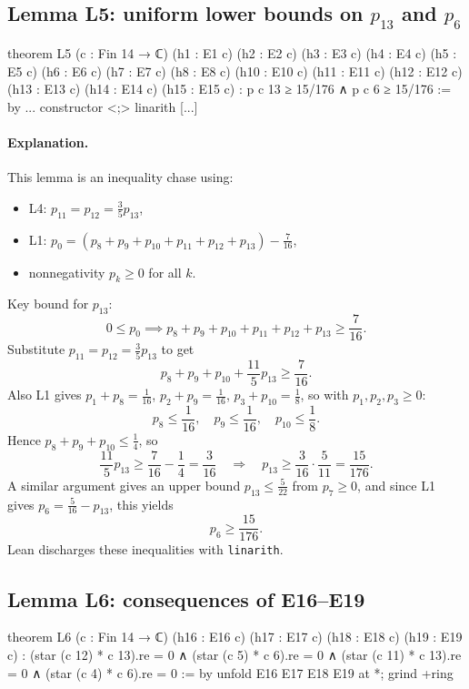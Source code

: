 \documentclass[11pt]{article}
\begin{document}
\subsection*{Lemma L5: uniform lower bounds on $p_{13}$ and $p_6$}

\begin{LeanCode}
theorem L5 (c : Fin 14 → ℂ)
  (h1 : E1 c) (h2 : E2 c) (h3 : E3 c) (h4 : E4 c)
  (h5 : E5 c) (h6 : E6 c) (h7 : E7 c) (h8 : E8 c)
  (h10 : E10 c) (h11 : E11 c) (h12 : E12 c)
  (h13 : E13 c) (h14 : E14 c) (h15 : E15 c) :
  p c 13 ≥ 15/176 ∧ p c 6 ≥ 15/176 := by
  ...
  constructor <;> linarith [...]
\end{LeanCode}

\paragraph{Explanation.}
This lemma is an inequality chase using:
\begin{itemize}
\item L4: $p_{11}=p_{12}=\frac35 p_{13}$,
\item L1: $p_0 = (p_8+p_9+p_{10}+p_{11}+p_{12}+p_{13})-\frac{7}{16}$,
\item nonnegativity $p_k\ge 0$ for all $k$.
\end{itemize}

Key bound for $p_{13}$:
\[
0\le p_0 \implies p_8+p_9+p_{10}+p_{11}+p_{12}+p_{13}\ge \frac{7}{16}.
\]
Substitute $p_{11}=p_{12}=\frac35 p_{13}$ to get
\[
p_8+p_9+p_{10}+\frac{11}{5}p_{13}\ge \frac{7}{16}.
\]
Also L1 gives $p_1+p_8=\frac1{16}$, $p_2+p_9=\frac1{16}$, $p_3+p_{10}=\frac18$, so with $p_1,p_2,p_3\ge 0$:
\[
p_8\le \frac{1}{16},\quad p_9\le \frac{1}{16},\quad p_{10}\le \frac{1}{8}.
\]
Hence $p_8+p_9+p_{10}\le \frac14$, so
\[
\frac{11}{5}p_{13}\ge \frac{7}{16}-\frac14=\frac{3}{16}
\quad\Longrightarrow\quad
p_{13}\ge \frac{3}{16}\cdot\frac{5}{11}=\frac{15}{176}.
\]
A similar argument gives an upper bound $p_{13}\le \frac{5}{22}$ from $p_7\ge 0$, and since L1 gives $p_6=\frac{5}{16}-p_{13}$, this yields
\[
p_6\ge \frac{15}{176}.
\]
Lean discharges these inequalities with \texttt{linarith}.

\subsection*{Lemma L6: consequences of E16--E19}

\begin{LeanCode}
theorem L6 (c : Fin 14 → ℂ)
  (h16 : E16 c) (h17 : E17 c) (h18 : E18 c) (h19 : E19 c) :
  (star (c 12) * c 13).re = 0 ∧
  (star (c 5) * c 6).re = 0 ∧
  (star (c 11) * c 13).re = 0 ∧
  (star (c 4) * c 6).re = 0 := by
  unfold E16 E17 E18 E19 at *;
  grind +ring
\end{LeanCode}
\end{document}

